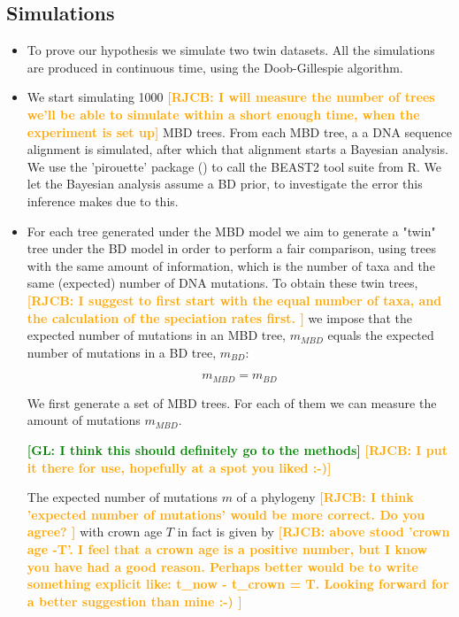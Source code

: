 \documentclass{article}
\newcommand*\richel[1]{\textcolor{orange}{\textbf{[RJCB: #1]}}}
\newcommand*\gio[1]{\textcolor{green}{\textbf{[GL: #1]}}}
\begin{document}
\subsection{Simulations}
\begin{itemize}

\item To prove our hypothesis we simulate two twin datasets. All the simulations are produced in continuous time, using the Doob-Gillespie algorithm. 

\item We start simulating 1000 \richel{I will measure the number of trees we'll be able to simulate within a short enough time, when the experiment is set up} MBD trees. From each MBD tree, a a DNA sequence alignment is simulated, after
which that alignment starts a Bayesian analysis. We use 
the 'pirouette' package (\cite{pirouette}) to call the BEAST2 tool 
suite from R. We let the Bayesian analysis assume a BD prior, to investigate
the error this inference makes due to this.

\item For each tree 
generated under the MBD model we aim to generate a "twin" tree under the BD model in order to perform a fair comparison, using trees 
with the same amount of information, 
which is the number of taxa 
and the same (expected) number of DNA mutations.
To obtain these twin trees, 
\richel{
  I suggest to first start with the equal number of taxa,
  and the calculation of the speciation rates first.
}
we impose
that the expected number of mutations in an MBD tree, $m_{MBD}$ equals
the expected number of mutations in a BD tree, $m_{BD}$:

\begin{equation}
m_{MBD} = m_{BD} \label{m equivalence}
\end{equation} 

We first generate a set of MBD trees. For each of them we can measure the amount of mutations $m_{MBD}$.

\gio{I think this should definitely go to the methods}
\richel{I put it there for use, hopefully at a spot you liked :-)}

The expected number of mutations $m$ of a phylogeny 
\richel{
  I think 'expected number of mutations' would be more correct.
  Do you agree?
}
with crown age $T$ in fact is given by
\richel{
  above stood 'crown age -T'. 
  I feel that a crown age is a positive number,
  but I know you have had a good reason.
  Perhaps better would be to write something explicit like:
  t\_now - t\_crown = T.
  Looking forward for a better suggestion than mine :-)
}


\end{itemize}
\end{document}
